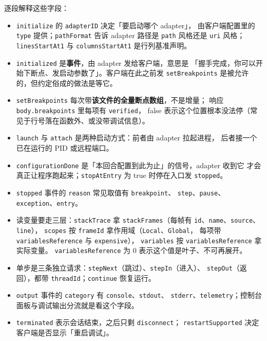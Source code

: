 \documentclass[12pt,a4paper,fontset=fandol]{ctexbook}
\newcommand{\Bk}{\discretionary{}{}{}}
\begin{document}
逐段解释这些字段：

\begin{itemize}
  \item \texttt{initialize} 的 \texttt{adapterID} 决定「要启动哪个 adapter」，
        由客户端配置里的 \texttt{type} 提供；\texttt{pathFormat} 告诉 adapter
        路径是 \texttt{path} 风格还是 \texttt{uri} 风格；\texttt{linesStartAt1}
        与 \texttt{columnsStartAt1} 是行列基准声明。
  \item \texttt{initialized} 是\textbf{事件}，由 adapter 发给客户端，意思是
        「握手完成，你可以开始下断点、发启动参数了」。客户端在此之前发
        \texttt{setBreakpoints} 是被允许的，但约定俗成的做法是等它。
  \item \texttt{setBreakpoints} 每次带\textbf{该文件的全量断点数组}，不是增量；
        响应 \texttt{body.}\Bk\texttt{breakpoints} 里每项有 \texttt{verified}，
        false 表示这个位置根本没法停（常见于行号落在函数外、或没带调试信息）。
  \item \texttt{launch} 与 \texttt{attach} 是两种启动方式：前者由 adapter 拉起进程，
        后者接一个已在运行的 PID 或远程端口。
  \item \texttt{configurationDone} 是「本回合配置到此为止」的信号，adapter 收到它
        才会真正让程序跑起来；\texttt{stopAtEntry} 为 true 时停在入口发 \texttt{stopped}。
  \item \texttt{stopped} 事件的 \texttt{reason} 常见取值有 \texttt{breakpoint}、
        \texttt{step}、\texttt{pause}、\texttt{exception}、\texttt{entry}。
  \item 读变量要走三层：\texttt{stackTrace} 拿 \texttt{stackFrames}（每帧有
        \texttt{id}、\texttt{name}、\texttt{source}、\texttt{line}），
        \texttt{scopes} 按 \texttt{frameId} 拿作用域（\texttt{Local}、\texttt{Global}，
        每项带 \texttt{variables}\Bk\texttt{Reference} 与 \texttt{expensive}），
        \texttt{variables} 按 \texttt{variables}\Bk\texttt{Reference} 拿实际变量。
        \texttt{variables}\Bk\texttt{Reference} 为 0 表示这个值是叶子、不可再展开。
  \item 单步是三条独立请求：\texttt{stepNext}（跳过）、\texttt{stepIn}（进入）、
        \texttt{stepOut}（返回），都带 \texttt{threadId}；\texttt{continue} 恢复运行。
  \item \texttt{output} 事件的 \texttt{category} 有 \texttt{console}、\texttt{stdout}、
        \texttt{stderr}、\texttt{telemetry}；控制台面板与调试输出分流就是看这个字段。
  \item \texttt{terminated} 表示会话结束，之后只剩 \texttt{disconnect}；
        \texttt{restartSupported} 决定客户端是否显示「重启调试」。
\end{itemize}
\end{document}
